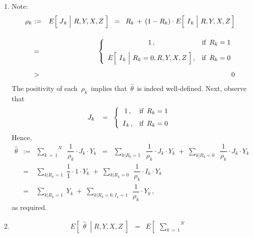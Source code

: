 \begin{enumerate}
\item
	Note:
	\begin{eqnarray*}
	\rho_{k}
	& \underset{{\color{white}\textnormal{\Huge 1}}}{:=} &
		E\!\left[\,\left.\overset{{\color{white}.}}{J}_{k}\;\right\vert\,R,Y,X,Z\;\right]
	\;\; = \;\;
		R_{k} \,+\, (1-R_{k}) \cdot E\!\left[\;\left.\overset{{\color{white}.}}{I}_{k}\;\right\vert\,R,Y,X,Z\,\right]
	\\
	& = &
		\left\{\begin{array}{cl}
		1\,, & \textnormal{if \,$R_{k} = 1$}
		\\
		\overset{{\color{white}1}}{E\!\left[\;\left.\overset{{\color{white}.}}{I}_{k}\;\right\vert\,R_{k}=0,R,Y,X,Z\;\right]}\,,
		& \textnormal{if \,$R_{k} = 0$}
		\end{array}\right.
	\\
	& > &
		\overset{{\color{white}\huge 1}}{0}
	\end{eqnarray*}
	The positivity of each \,$\rho_{k}$\, implies that \,$\widehat{\theta}$\, is indeed well-defined.
	Next, observe that
	\begin{equation*}
	J_{k}
	\;\;\ = \;\;
		\left\{\begin{array}{cl}
		1\,, & \textnormal{if \,$R_{k} = 1$}
		\\
		\overset{{\color{white}1}}{I}_{k}\,, & \textnormal{if \,$R_{k} = 0$}
		\end{array}\right.
	\end{equation*}
	Hence,
	\begin{eqnarray*}
	\widehat{\theta}
	& := &
		\overset{N}{\underset{k\,=\,1}{\sum}}\;\;
		\dfrac{1}{\rho_{k}} \cdot J_{k} \cdot Y_{k}
	\;\; = \;\;
		\underset{k\vert R_{k}=1}{\sum}\;\; \dfrac{1}{\rho_{k}} \cdot J_{k} \cdot Y_{k}
		\; + \;
		\underset{k\vert R_{k}=0}{\sum}\;\; \dfrac{1}{\rho_{k}} \cdot J_{k} \cdot Y_{k}
	\\
	& = &
		\underset{k\vert R_{k}=1}{\sum}\; \dfrac{1}{1} \cdot 1 \cdot Y_{k}
		\; + \;
		\underset{k\vert R_{k}=0}{\sum}\;\, \dfrac{1}{\rho_{k}} \cdot I_{k} \cdot Y_{k}
	\\
	& = &
		\underset{k\vert R_{k}=1}{\sum}\; Y_{k}
		\; + \;
		\underset{k\vert R_{k}=0,I_{k}=1}{\sum}\;\, \dfrac{1}{\rho_{k}} \cdot Y_{k}\,,
	\end{eqnarray*}
	as required.
\item
	\begin{eqnarray*}
	E\!\left[\;\,\left.\widehat{\theta}\;\;\right\vert\;R,Y,X,Z\;\right]
	& = &
		E\!\left[\;\,
			\left.
			\overset{N}{\underset{k\,=\,1}{\sum}}\;\;

\end{eqnarray*}
\end{enumerate}
